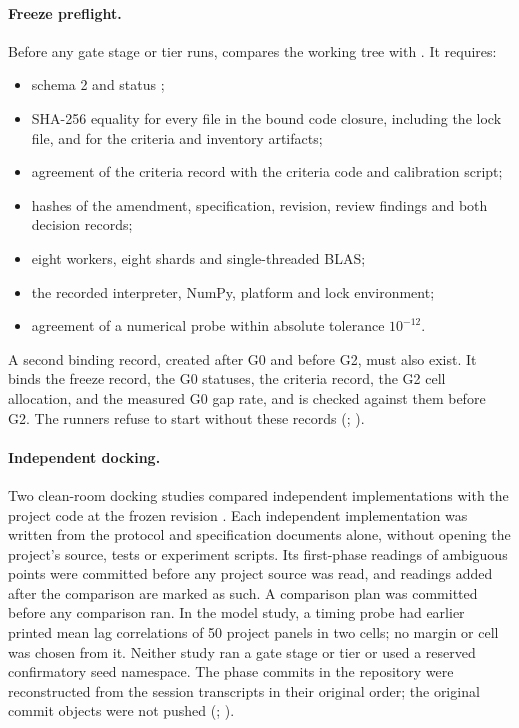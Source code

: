 \paragraph{Freeze preflight.}
Before any gate stage or tier runs,  compares the working tree with . It requires:
\begin{itemize}
\item schema 2 and status ;
\item SHA-256 equality for every file in the bound code closure, including the lock file, and for the criteria and inventory artifacts;
\item agreement of the criteria record with the criteria code and calibration script;
\item hashes of the amendment, specification, revision, review findings and both decision records;
\item eight workers, eight shards and single-threaded BLAS;
\item the recorded interpreter, NumPy, platform and lock environment;
\item agreement of a numerical probe within absolute tolerance $10^{-12}$.
\end{itemize}
A second binding record, created after G0 and before G2, must also exist. It binds the freeze record, the G0 statuses, the criteria record, the G2 cell allocation, and the measured G0 gap rate, and is checked against them before G2. The runners refuse to start without these records (; ).

\paragraph{Independent docking.}
Two clean-room docking studies compared independent implementations with the project code at the frozen revision . Each independent implementation was written from the protocol and specification documents alone, without opening the project's source, tests or experiment scripts. Its first-phase readings of ambiguous points were committed before any project source was read, and readings added after the comparison are marked as such. A comparison plan was committed before any comparison ran. In the model study, a timing probe had earlier printed mean lag correlations of 50 project panels in two cells; no margin or cell was chosen from it. Neither study ran a gate stage or tier or used a reserved confirmatory seed namespace. The phase commits in the repository were reconstructed from the session transcripts in their original order; the original commit objects were not pushed (; ).

